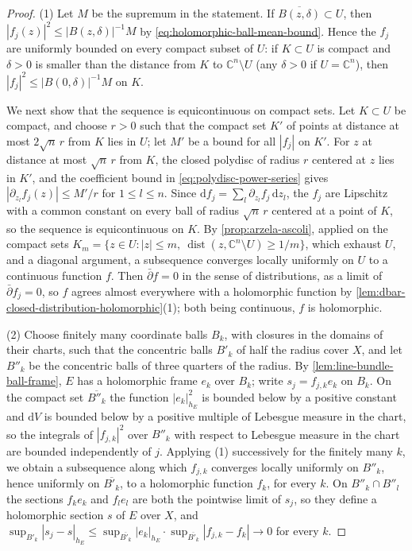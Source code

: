 \begin{proof}
(1) Let $M$ be the supremum in the statement. If $\overline{B(z,\delta)}\subset U$, then $|f_j(z)|^2\leq|B(z,\delta)|^{-1}M$ by \eqref{eq:holomorphic-ball-mean-bound}. Hence the $f_j$ are uniformly bounded on every compact subset of $U$: if $K\subset U$ is compact and $\delta>0$ is smaller than the distance from $K$ to $\mathbb C^n\setminus U$ (any $\delta>0$ if $U=\mathbb C^n$), then $|f_j|^2\leq|B(0,\delta)|^{-1}M$ on $K$.

We next show that the sequence is equicontinuous on compact sets. Let $K\subset U$ be compact, and choose $r>0$ such that the compact set $K'$ of points at distance at most $2\sqrt n\,r$ from $K$ lies in $U$; let $M'$ be a bound for all $|f_j|$ on $K'$. For $z$ at distance at most $\sqrt n\,r$ from $K$, the closed polydisc of radius $r$ centered at $z$ lies in $K'$, and the coefficient bound in \eqref{eq:polydisc-power-series} gives $|\partial_{z_l}f_j(z)|\leq M'/r$ for $1\leq l\leq n$. Since $\mathrm df_j=\sum_l\partial_{z_l}f_j\,\mathrm dz_l$, the $f_j$ are Lipschitz with a common constant on every ball of radius $\sqrt n\,r$ centered at a point of $K$, so the sequence is equicontinuous on $K$. By \cref{prop:arzela-ascoli}, applied on the compact sets $K_m=\{z\in U:|z|\leq m,\ \operatorname{dist}(z,\mathbb C^n\setminus U)\geq1/m\}$, which exhaust $U$, and a diagonal argument, a subsequence converges locally uniformly on $U$ to a continuous function $f$. Then $\bar\partial f=0$ in the sense of distributions, as a limit of $\bar\partial f_j=0$, so $f$ agrees almost everywhere with a holomorphic function by \cref{lem:dbar-closed-distribution-holomorphic}(1); both being continuous, $f$ is holomorphic.

(2) Choose finitely many coordinate balls $B_k$, with closures in the domains of their charts, such that the concentric balls $B'_k$ of half the radius cover $X$, and let $B''_k$ be the concentric balls of three quarters of the radius. By \cref{lem:line-bundle-ball-frame}, $E$ has a holomorphic frame $e_k$ over $B_k$; write $s_j=f_{j,k}e_k$ on $B_k$. On the compact set $\overline{B''_k}$ the function $|e_k|_{h_E}^2$ is bounded below by a positive constant and $\mathrm dV$ is bounded below by a positive multiple of Lebesgue measure in the chart, so the integrals of $|f_{j,k}|^2$ over $B''_k$ with respect to Lebesgue measure in the chart are bounded independently of $j$. Applying (1) successively for the finitely many $k$, we obtain a subsequence along which $f_{j,k}$ converges locally uniformly on $B''_k$, hence uniformly on $\overline{B'_k}$, to a holomorphic function $f_k$, for every $k$. On $B''_k\cap B''_l$ the sections $f_ke_k$ and $f_le_l$ are both the pointwise limit of $s_j$, so they define a holomorphic section $s$ of $E$ over $X$, and $\sup_{B'_k}|s_j-s|_{h_E}\leq\sup_{\overline{B'_k}}|e_k|_{h_E}\cdot\sup_{\overline{B'_k}}|f_{j,k}-f_k|\to0$ for every $k$.


\end{proof}
